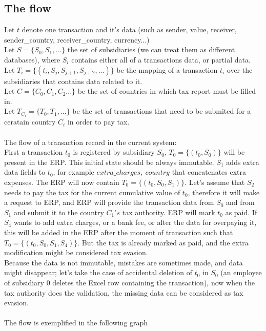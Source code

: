 \subsection{The flow}
Let $t$ denote one transaction and it's data (such as sender, value, receiver, sender\_country, receiver\_country, currency...)\\ 
Let $S=\{S_0,S_1,...\}$ the set of subsidiaries (we can treat them as different databases), where $S_i$ contains either all of a transactions data, or partial data.\\
Let $T_i=\{(t_i,S_{j},S_{j+1},S_{j+2},...)\}$ be the mapping of a transaction $t_i$ over the subsidiaries that contains data related to it.\\ 
Let $C=\{C_0,C_1,C_2...\}$ be the set of countries in which tax report must be filled in.\\
Let $T_{C_i}=\{T_0, T_1,...\}$ be the set of transactions that need to be submited for a ceratain country $C_i$ in order to pay tax.\\
\\
The flow of a transaction record in the current system:\\
First a transaction $t_0$ is registered by subsidiary $S_0$, $T_0=\{(t_0,S_0)\}$ will be present in the ERP. This initial state should be always immutable. $S_1$ adds extra data fields to $t_0$, for example $extra\_charges,\ country$ that concatenates extra expenses. The ERP will now contain $T_0=\{(t_0,S_0,S_1)\}$. Let's assume that $S_2$ needs to pay the tax for the current cumulative value of $t_0$, therefore it will make a request to ERP, and ERP will provide the transaction data from $S_0$ and from $S_1$ and submit it to the country $C_1's$ tax authority. ERP will mark $t_0$ as paid. If $S_4$ wants to add extra charges, or a bank fee, or alter the data for overpaying it, this will be added in the ERP after the moment of transaction such that $T_0=\{(t_0,S_0,S_1,S_4)\}$. But the tax is already marked as paid, and the extra modification might be considered tax evasion.\\
Because the data is not immutable, mistakes are sometimes made, and data might disappear; let's take the case of accidental deletion of $t_0$ in $S_0$ (an employee of subsidiary 0 deletes the Excel row containing the transaction), now when the tax authority does the validation, the missing data can be considered as tax evasion.\\
\\
The flow is exemplified in the following graph
